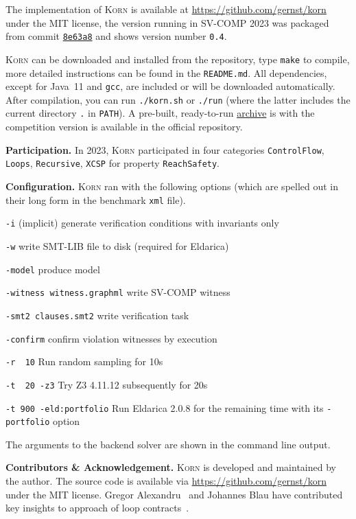 \documentclass{llncs}
\newcommand{\Korn}{\textsc{Korn}\xspace}
\begin{document}
The implementation of \Korn is available at
    \url{https://github.com/gernst/korn} under the MIT license,
the version running in SV-COMP 2023 was packaged from commit
\href{https://github.com/gernst/korn/commit/8e968dd9e1498d358270d1e78d473befca8e63a8}{\tt 8e63a8}
and shows version number \texttt{0.4}.

\Korn can be downloaded and installed from the repository, type \texttt{make} to compile,
more detailed instructions can be found in the \texttt{README.md}.
All dependencies, except for Java~11 and \texttt{gcc}, are included or will be downloaded automatically.
After compilation, you can run \texttt{./korn.sh} or \texttt{./run}
(where the latter includes the current directory \texttt{.} in \texttt{PATH}).
A pre-built, ready-to-run
\href{https://gitlab.com/gernst/svcomp-archives-2023/-/blob/master/2023/korn.zip}{archive}
is with the competition version is available in the official repository.

\smallskip

\textbf{Participation.} In 2023, \Korn participated in four categories
\texttt{ControlFlow},
\texttt{Loops},
\texttt{Recursive},
\texttt{XCSP}
for property \texttt{ReachSafety}.


\smallskip
\textbf{Configuration.}
\Korn ran with the following options
(which are spelled out in their long form in the benchmark \texttt{xml} file).

\texttt{-i} (implicit)
    \tabto{2.8cm} generate verification conditions with invariants only

\texttt{-w}
    \tabto{2.8cm} write SMT-LIB file to disk (required for Eldarica)

\smallskip

\texttt{-model} 
    \tabto{4.8cm} produce model

\texttt{-witness witness.graphml}
    \tabto{4.8cm} write SV-COMP witness

\texttt{-smt2 clauses.smt2}
    \tabto{4.8cm} write verification task

\texttt{-confirm} 
    \tabto{4.8cm} confirm violation witnesses by execution

\smallskip

\texttt{-r~~10}
    \tabto{4.8cm} Run random sampling for 10s

\texttt{-t~~20 -z3}
    \tabto{4.8cm} Try Z3 4.11.12 subsequently for 20s

\texttt{-t~900 -eld:portfolio}
    \tabto{4.8cm} Run Eldarica 2.0.8 for the remaining time
    \tabto{4.8cm} with its \texttt{-portfolio} option

\smallskip

\noindent
The arguments to the backend solver are shown in the command line output.

\smallskip

\textbf{Contributors \& Acknowledgement.}
\Korn is developed and maintained by the author.
The source code is available via \url{https://github.com/gernst/korn} under the MIT license.
Gregor Alexandru~\cite{alexandru2019} and Johannes Blau have contributed
key insights to approach of loop contracts~\cite{ernst:vmcai2022}.



\end{document}
